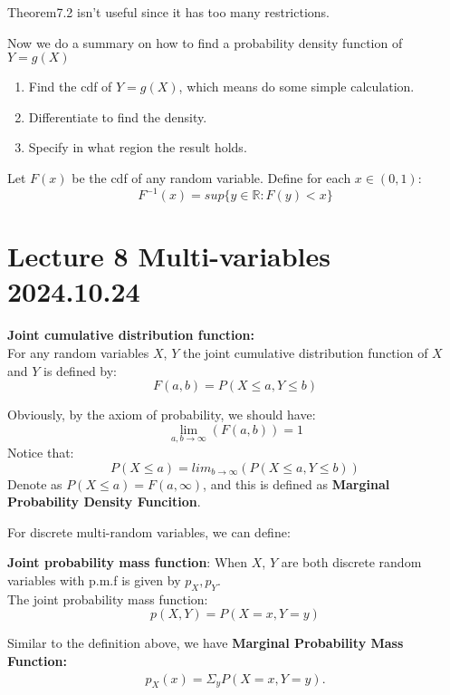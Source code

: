 \documentclass{article}
\begin{document}
Theorem7.2 isn't useful since it has too many restrictions.

Now we do a summary on how to find a probability density function of $Y = g(X)$
\begin{enumerate}
    \item Find the cdf of $Y = g(X)$, which means do some simple calculation.
    \item Differentiate to find the density.
    \item Specify in what region the result holds.
\end{enumerate}

\begin{theorem}
    Let $F(x)$ be the cdf of any random variable. Define for each $x \in (0,1)$:
    $$ F^{-1}(x) = sup\{y \in \mathbb{R}: F(y) < x\}$$
\end{theorem}






\section{Lecture 8 Multi-variables 2024.10.24}

\begin{definition}
    \textbf{Joint cumulative distribution function:}\\
    For any random variables $X$, $Y$ the joint cumulative distribution function of $X$ and $Y$ is defined by:
    $$ F(a, b) = P(X \leq a, Y \leq b)$$
\end{definition}
Obviously, by the axiom of probability, we should have:
$$ \lim_{a, b \rightarrow \infty}(F(a,b)) = 1 $$
Notice that:
$$ P(X \leq a) = lim_{b \rightarrow \infty}(P(X \leq a, Y \leq b))$$
Denote as $P(X \leq a) = F(a, \infty)$, and this is defined as \textbf{Marginal Probability Density Funcition}.

For discrete multi-random variables, we can define:
\begin{definition}
    \textbf{Joint probability mass function}:
    When $X$, $Y$ are both discrete random variables with p.m.f is given by $p_X,p_Y$.\\
    The joint probability mass function:
    $$ p(X,Y) = P(X = x, Y = y)$$
\end{definition}
Similar to the definition above, we have \textbf{Marginal Probability Mass Function:}
\begin{align*}
    p_X(x) = \Sigma_yP(X = x, Y = y).
\end{align*}
\end{document}
